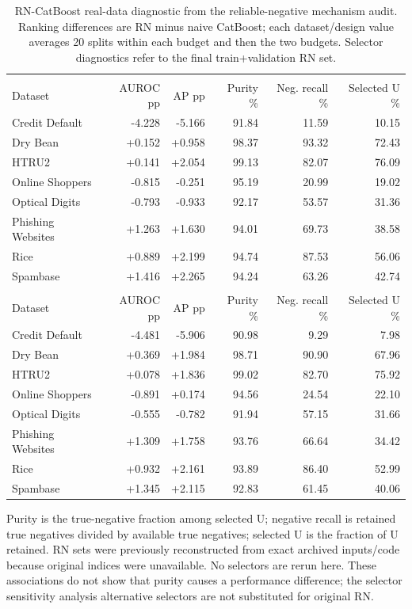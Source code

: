\begin{table}[t]
\centering
\caption{RN-CatBoost real-data diagnostic from the reliable-negative mechanism audit. Ranking differences are RN minus naive CatBoost; each dataset/design value averages 20 splits within each budget and then the two budgets. Selector diagnostics refer to the final train+validation RN set.}
\label{tab:s-real-rn-diagnostic}
\small
\setlength{\tabcolsep}{3.5pt}
\renewcommand{\arraystretch}{1.08}
\begin{tabularx}{\textwidth}{>{\raggedright\arraybackslash}Xrrrrr}
\toprule
\multicolumn{6}{l}{\textbf{One-sample}}\\
Dataset & AUROC pp & AP pp & Purity \% & Neg. recall \% & Selected U \%\\
\midrule
Credit Default & -4.228 & -5.166 & 91.84 & 11.59 & 10.15 \\
Dry Bean & +0.152 & +0.958 & 98.37 & 93.32 & 72.43 \\
HTRU2 & +0.141 & +2.054 & 99.13 & 82.07 & 76.09 \\
Online Shoppers & -0.815 & -0.251 & 95.19 & 20.99 & 19.02 \\
Optical Digits & -0.793 & -0.933 & 92.17 & 53.57 & 31.36 \\
Phishing Websites & +1.263 & +1.630 & 94.01 & 69.73 & 38.58 \\
Rice & +0.889 & +2.199 & 94.74 & 87.53 & 56.06 \\
Spambase & +1.416 & +2.265 & 94.24 & 63.26 & 42.74 \\
\midrule
\multicolumn{6}{l}{\textbf{Two-sample}}\\
Dataset & AUROC pp & AP pp & Purity \% & Neg. recall \% & Selected U \%\\
\midrule
Credit Default & -4.481 & -5.906 & 90.98 & 9.29 & 7.98 \\
Dry Bean & +0.369 & +1.984 & 98.71 & 90.90 & 67.96 \\
HTRU2 & +0.078 & +1.836 & 99.02 & 82.70 & 75.92 \\
Online Shoppers & -0.891 & +0.174 & 94.56 & 24.54 & 22.10 \\
Optical Digits & -0.555 & -0.782 & 91.94 & 57.15 & 31.66 \\
Phishing Websites & +1.309 & +1.758 & 93.76 & 66.64 & 34.42 \\
Rice & +0.932 & +2.161 & 93.89 & 86.40 & 52.99 \\
Spambase & +1.345 & +2.115 & 92.83 & 61.45 & 40.06 \\
\bottomrule
\end{tabularx}
\par\medskip
\begin{minipage}{\textwidth}\small
Purity is the true-negative fraction among selected U; negative recall is retained true negatives divided by available true negatives; selected U is the fraction of U retained. RN sets were previously reconstructed from exact archived inputs/code because original indices were unavailable. No selectors are rerun here. These associations do not show that purity causes a performance difference; the selector sensitivity analysis alternative selectors are not substituted for original RN.
\end{minipage}
\end{table}
